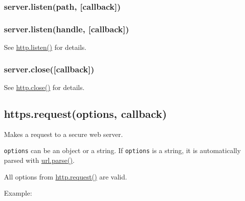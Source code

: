 \subsubsection{server.listen(path, {[}callback{]})}

\subsubsection{server.listen(handle, {[}callback{]})}

See
\href{http.html\#http\_server\_listen\_port\_hostname\_backlog\_callback}{http.listen()}
for details.

\subsubsection{server.close({[}callback{]})}

See \href{http.html\#http\_server\_close\_callback}{http.close()} for
details.

\subsection{https.request(options, callback)}

Makes a request to a secure web server.

\texttt{options} can be an object or a string. If \texttt{options} is a
string, it is automatically parsed with
\href{url.html\#url.parse}{url.parse()}.

All options from
\href{http.html\#http\_http\_request\_options\_callback}{http.request()}
are valid.

Example:

